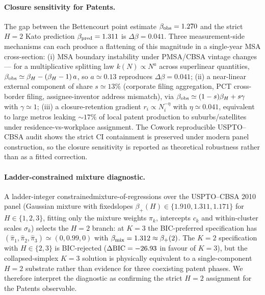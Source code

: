 \paragraph{Closure sensitivity for Patents.} The gap between the Bettencourt point estimate $\beta_{\rm obs}=1.270$ and the strict $H=2$ Kato prediction $\beta_{\rm pred}=1.311$ is $\Delta\beta=0.041$. Three measurement-side mechanisms can each produce a flattening of this magnitude in a single-year MSA cross-section: (i) MSA boundary instability under PMSA/CBSA vintage changes — for a multiplicative splitting law $k(N)\propto N^a$ across superlinear quantities, $\beta_{\rm obs}\simeq\beta_H-(\beta_H-1)\,a$, so $a\simeq 0.13$ reproduces $\Delta\beta=0.041$; (ii) a near-linear external component of share $s\simeq 13\%$ (corporate filing aggregation, PCT cross-border filing, assignee-inventor address mismatch), via $\beta_{\rm obs}\simeq(1-s)\beta_H+s\gamma$ with $\gamma\simeq 1$; (iii) a closure-retention gradient $r_i\propto N_i^{-\eta}$ with $\eta\simeq 0.041$, equivalent to large metros leaking $\sim 17\%$ of local patent production to suburbs/satellites under residence-vs-workplace assignment. The Cowork reproducible USPTO--CBSA audit shows the strict CI containment is preserved under modern panel construction, so the closure sensitivity is reported as theoretical robustness rather than as a fitted correction.

\paragraph{Ladder-constrained mixture diagnostic.} A ladder-integer constrained\linebreak mixture-of-regressions over the USPTO--CBSA 2010 panel (Gaussian mixture with fixed\linebreak slopes $\beta_+(H)\in\{1.910,1.311,1.171\}$ for $H\in\{1,2,3\}$, fitting only the mixture weights $\pi_k$, intercepts $c_k$ and within-cluster scales $\sigma_k$) selects the $H=2$ branch: at $K=3$ the BIC-preferred specification has $(\hat\pi_1,\hat\pi_2,\hat\pi_3)\simeq(0,0.99,0)$ with $\beta_{\rm mix}=1.312\approx\beta_+(2)$. The $K=2$ specification with $H\!\in\!\{2,3\}$ is BIC-rejected ($\Delta{\rm BIC}=-26.93$ in favour of $K=3$), but the collapsed-simplex $K=3$ solution is physically equivalent to a single-component $H=2$ substrate rather than evidence for three coexisting patent phases. We therefore interpret the diagnostic as confirming the strict $H=2$ assignment for the Patents observable.

